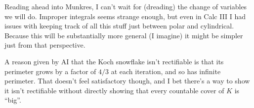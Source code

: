\documentclass[12pt]{article}
\begin{document}
Reading ahead into Munkres, I can't wait for (dreading) the change of variables we will do.
Improper integrals seems strange enough, but even in Calc III I had issues with keeping track of all this stuff
just between polar and cylindrical. Because this will be substantially more general (I imagine)
it might be simpler just from that perspective.

A reason given by AI that the Koch snowflake isn't rectifiable is that its perimeter grows by a factor of $4/3$
at each iteration, and so has infinite perimeter.
That doesn't feel satisfactory though, and I bet there's a way to show it isn't rectifiable
without directly showing that every countable cover of $K$ is ``big''.
\end{document}
